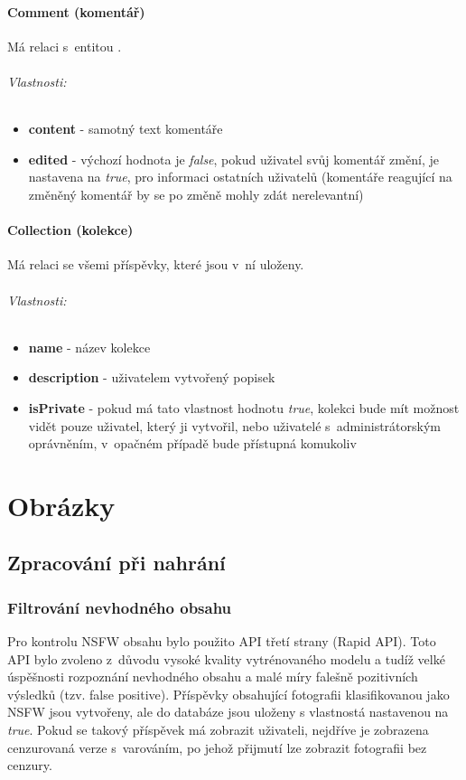 \documentclass[12pt, a4paper,
  oneside,      %
]{report}
\newenvironment{propertiesItemize}{
\begin{itemize}{ 
  }}
  {\end{itemize}}
\begin{document}
\subsubsection{Comment (komentář)} Má relaci  s~entitou .
\subparagraph{Vlastnosti:}
\begin{propertiesItemize}
	\item \textbf{content} - samotný text komentáře
	\item \textbf{edited} - výchozí hodnota je \textit{false}, pokud uživatel svůj komentář změní, je nastavena na \textit{true}, pro informaci ostatních uživatelů (komentáře reagující na změněný komentář by se po změně mohly zdát nerelevantní)
\end{propertiesItemize}
\subsubsection{Collection (kolekce)} Má relaci  se všemi příspěvky, které jsou v~ní uloženy.
\subparagraph{Vlastnosti:}
\begin{propertiesItemize}
	\item \textbf{name} - název kolekce
	\item \textbf{description} - uživatelem vytvořený popisek
	\item \textbf{isPrivate} - pokud má tato vlastnost hodnotu \textit{true}, kolekci bude mít možnost vidět pouze uživatel, který ji vytvořil, nebo uživatelé s~administrátorským oprávněním, v~opačném případě bude přístupná komukoliv
\end{propertiesItemize} 

\chapter{Obrázky}
\section{Zpracování při nahrání}
\subsection{Filtrování nevhodného obsahu}\label{section:nsfw_filter}
Pro kontrolu NSFW obsahu bylo použito API třetí strany (Rapid API). Toto API bylo zvoleno z~důvodu vysoké kvality vytrénovaného modelu a tudíž velké úspěšnosti rozpoznání nevhodného obsahu a malé míry falešně pozitivních výsledků (tzv. false positive). Příspěvky obsahující fotografii klasifikovanou jako NSFW jsou vytvořeny, ale do databáze jsou uloženy s vlastnostá  nastavenou na \textit{true}. Pokud se takový příspěvek má zobrazit uživateli, nejdříve je zobrazena cenzurovaná verze s~varováním, po jehož přijmutí lze zobrazit fotografii bez cenzury.
\end{document}
